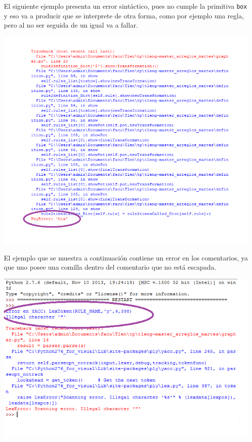 El siguiente ejemplo presenta un error sint\'actico, pues no cumple la primitiva \texttt{box} y eso va a producir que se interprete de otra forma, como por ejemplo una regla, pero al no ser seguida de un igual va a fallar.\\



\centerline{\includegraphics[scale=0.70]{../imagenes/eg22invalid2.png}}

El ejemplo que se muestra a continuaci\'on contiene un error en los comentarios, ya que uno posee una comilla dentro del comentario que no est\'a escapada.\\



\centerline{\includegraphics[scale=0.70]{../imagenes/carainvalid.png}}